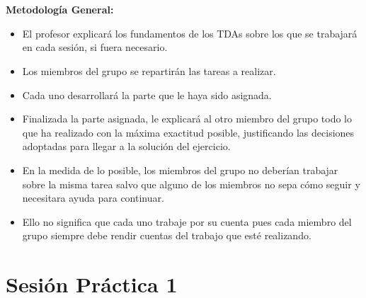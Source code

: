 






\localtableofcontents

\

\

\textbf{Metodología General:}

\begin{itemize}
\item El profesor explicará los fundamentos de los TDAs sobre los que se trabajará en cada sesión, si fuera necesario.
\item Los miembros del grupo se repartirán las tareas a realizar.
\item Cada uno desarrollará la parte que le haya sido asignada.
\item Finalizada la parte asignada, le explicará al otro miembro del grupo todo lo que ha realizado con la máxima exactitud posible, justificando las decisiones adoptadas para llegar a la solución del ejercicio.
\item En la medida de lo posible, los miembros del grupo no deberían trabajar sobre la misma tarea salvo que alguno de los miembros no sepa cómo seguir y necesitara ayuda para continuar.
\item Ello no significa que cada uno trabaje por su cuenta pues cada miembro del grupo siempre debe rendir cuentas del trabajo que esté realizando.
\end{itemize}



\newpage


\section*{Sesión Práctica 1 }

